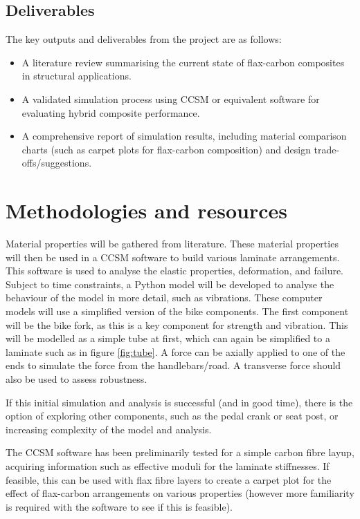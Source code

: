 \documentclass[9pt,twocolumn,twoside]{article}
\begin{document}
\subsection*{Deliverables}
The key outputs and deliverables from the project are as follows:

\begin{itemize}
  \item A literature review summarising the current state of flax-carbon composites in structural applications.
  \item A validated simulation process using CCSM or equivalent software for evaluating hybrid composite performance.
  \item A comprehensive report of simulation results, including material comparison charts (such as carpet plots for flax-carbon composition) and design trade-offs/suggestions.
\end{itemize}

\section{Methodologies and resources}

Material properties will be gathered from literature. These material properties will then be used in a CCSM software to build various laminate arrangements. This software is used to analyse the elastic properties, deformation, and failure. Subject to time constraints, a Python model will be developed to analyse the behaviour of the model in more detail, such as vibrations. These computer models will use a simplified version of the bike components. The first component will be the bike fork, as this is a key component for strength and vibration. This will be modelled as a simple tube at first, which can again be simplified to a laminate such as in figure \ref{fig:tube}. A force can be axially applied to one of the ends to simulate the force from the handlebars/road. A transverse force should also be used to assess robustness.

If this initial simulation and analysis is successful (and in good time), there is the option of exploring other components, such as the pedal crank or seat post, or increasing complexity of the model and analysis.

The CCSM software has been preliminarily tested for a simple carbon fibre layup, acquiring information such as effective moduli for the laminate stiffnesses. If feasible, this can be used with flax fibre layers to create a carpet plot for the effect of flax-carbon arrangements on various properties (however more familiarity is required with the software to see if this is feasible).
\end{document}
